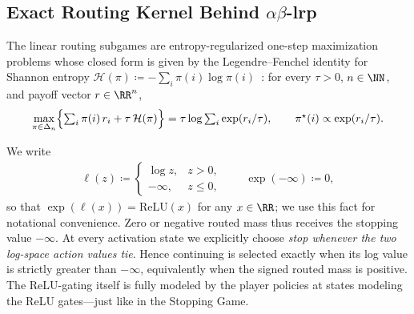 \subsection{Exact Routing Kernel Behind \texorpdfstring{$\alpha\beta$-\ac{lrp}}{alpha-beta LRP}}\label{ptnb:app:routing-kernel}

The linear routing subgames are entropy-regularized one-step maximization problems whose closed
form is given by the Legendre--Fenchel identity for Shannon entropy $\mathcal{H}(\pi) \coloneqq
    -\sum_i \pi(i)\log\pi(i)$~\parencite{BoydVandenberghe2004}: for every $\tau>0$, $n\in\NN$, and payoff
vector $r \in \RR^n$,
\begin{align}\label{ptnb:eq:gibbs-lse}
    \max_{\pi \in \Delta_n} \Bigl\{ \textstyle\sum_{i} \pi(i)\, r_i + \tau\, \mathcal{H}(\pi) \Bigr\}
    = \tau \log \textstyle\sum_{i} \exp(r_i/\tau),
    \qquad \pi^\star(i) \propto \exp(r_i/\tau).
\end{align}

We write
\begin{align}
    \ell(z) \coloneqq
    \begin{cases}
        \log z, & z > 0, \\
        -\infty, & z \le 0,
    \end{cases}
    \qquad \exp(-\infty) \coloneqq 0,
\end{align}
so that $\exp(\ell(x)) = \text{ReLU}(x)$ for any $x \in \RR$; we use this fact for notational
convenience. Zero or negative routed mass thus receives the stopping value $-\infty$. At every activation state we explicitly choose \emph{stop whenever the two log-space action values tie}. Hence continuing is selected exactly when its log value is strictly greater than $-\infty$, equivalently when the signed routed mass is positive. The ReLU-gating itself is fully modeled by the player policies at states modeling the
ReLU gates---just like in the Stopping Game.

